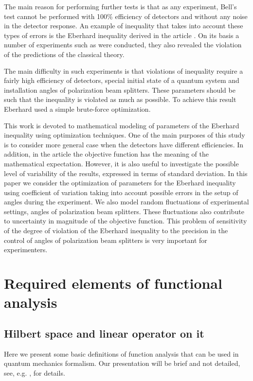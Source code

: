 \documentclass[%
master,         %
subf,           %
href,           %
colorlinks=true %
]{disser}
\numberwithin{equation}{section}
\numberwithin{figure}{section}
\begin{document}
The main reason for performing further tests is that as any experiment, Bell's test cannot be performed with 100\% efficiency of detectors and without any noise in the detector response. An example of inequality that takes into account these types of errors is the Eberhard inequality derived in the article \cite{Eberhard}. On its basis a number of experiments such as \cite{Zeilinger} were conducted, they also revealed the violation of the predictions of the classical theory.

The main difficulty in such experiments is that violations of inequality require a fairly high efficiency of detectors, special initial state of a quantum system and installation angles of polarization beam splitters. These parameters should be such that the inequality is violated as much as possible. To achieve this result Eberhard used a simple brute-force optimization.

This work is devoted to mathematical modeling of parameters of the Eberhard inequality using optimization techniques. One of the main purposes of this study is to consider more general case when the detectors have different efficiencies. In addition, in the article \cite{Eberhard} the objective function has the meaning of the mathematical expectation. However, it is also useful to investigate the possible level of variability of the results, expressed in terms of standard deviation. In this paper we consider the optimization of parameters for the Eberhard inequality using coefficient of variation taking into account possible errors in the setup of angles during the experiment. We also model random fluctuations of experimental settings, angles of polarization beam splitters. These fluctuations also contribute to uncertainty in magnitude of the objective function. This problem of sensitivity of the degree of violation of the Eberhard inequality to the precision in the control of angles of polarization beam splitters is very important for experimenters.  

\section{Required elements of functional analysis}
\subsection{Hilbert space and linear operator on it}
Here we present some basic definitions of function analysis that can be used in quantum mechanics formalism. Our presentation will be brief and not detailed, see, e.g. \cite{advanced_la}, for details.
\end{document}
